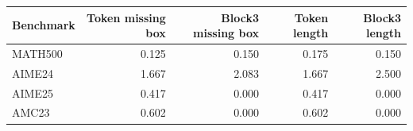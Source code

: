 \begin{tabular}{lrrrr}
\toprule
Benchmark & Token missing box & Block3 missing box & Token length & Block3 length \\
\midrule
MATH500 & 0.125 & 0.150 & 0.175 & 0.150 \\
AIME24 & 1.667 & 2.083 & 1.667 & 2.500 \\
AIME25 & 0.417 & 0.000 & 0.417 & 0.000 \\
AMC23 & 0.602 & 0.000 & 0.602 & 0.000 \\
\bottomrule
\end{tabular}
